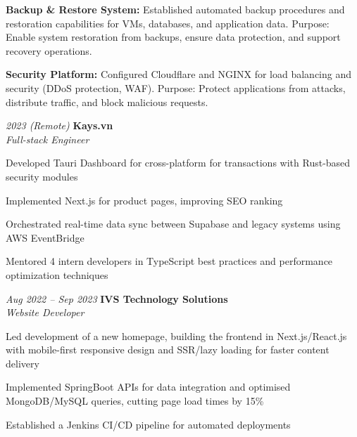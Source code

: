 \begin{onecolentry}
\begin{highlights}
        \item \textbf{Backup \& Restore System:} Established automated backup procedures and restoration capabilities for VMs, databases, and application data. Purpose: Enable system restoration from backups, ensure data protection, and support recovery operations.
        \item \textbf{Security Platform:} Configured Cloudflare and NGINX for load balancing and security (DDoS protection, WAF). Purpose: Protect applications from attacks, distribute traffic, and block malicious requests.
    \end{highlights}
\end{onecolentry}
\vspace{0.2 cm}

\begin{twocolentry}{\textit{2023 (Remote)}}
    \textbf{Kays.vn} \\[4pt]
    \textit{Full-stack Engineer}
\end{twocolentry}
\begin{onecolentry}
    \begin{highlights}
        \item Developed Tauri Dashboard for cross-platform for transactions with Rust-based security modules
        \item Implemented Next.js for product pages, improving SEO ranking
        \item Orchestrated real-time data sync between Supabase and legacy systems using AWS EventBridge
        \item Mentored 4 intern developers in TypeScript best practices and performance optimization techniques
    \end{highlights}
\end{onecolentry}
\vspace{0.2 cm}

\begin{twocolentry}{\textit{Aug 2022 -- Sep 2023}}
    \textbf{IVS Technology Solutions} \\[4pt]
    \textit{Website Developer}
\end{twocolentry}
\begin{onecolentry}
    \begin{highlights}
        \item Led development of a new homepage, building the frontend in Next.js/React.js with mobile-first responsive design and SSR/lazy loading for faster content delivery
        \item Implemented SpringBoot APIs for data integration and optimised MongoDB/MySQL queries, cutting page load times by 15\%
        \item Established a Jenkins CI/CD pipeline for automated deployments
    \end{highlights}
\end{onecolentry}

